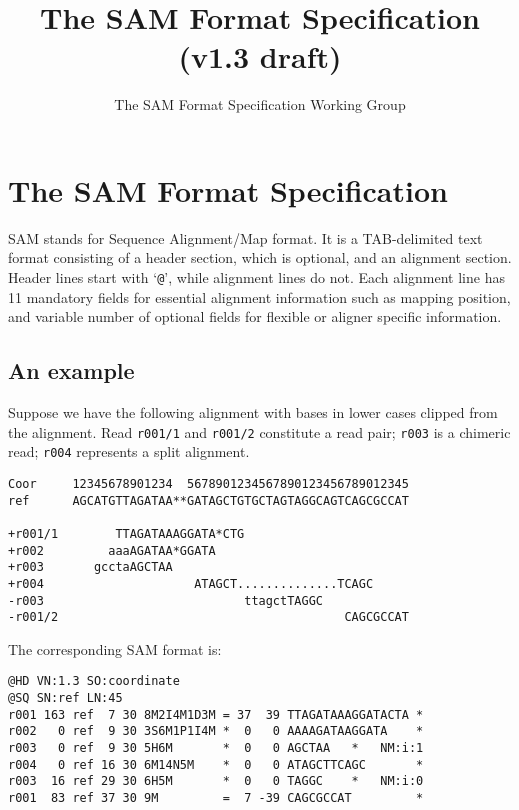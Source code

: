 \documentclass[10pt]{article}
\title{The SAM Format Specification (v1.3 draft)}
\author{The SAM Format Specification Working Group}
\begin{document}
\maketitle


\section{The SAM Format Specification}
SAM stands for Sequence Alignment/Map format. It is a TAB-delimited text
format consisting of a header section, which is optional, and an
alignment section. Header lines start with `{\tt @}', while alignment
lines do not. Each alignment line has 11 mandatory fields for essential
alignment information such as mapping position, and variable number of
optional fields for flexible or aligner specific information.

\subsection{An example}
Suppose we have the following alignment with bases in lower cases
clipped from the alignment. Read {\tt r001/1} and {\tt r001/2}
constitute a read pair; {\tt r003} is a chimeric read; {\tt r004}
represents a split alignment.

\begin{framed}\small
\begin{verbatim}
Coor     12345678901234  5678901234567890123456789012345
ref      AGCATGTTAGATAA**GATAGCTGTGCTAGTAGGCAGTCAGCGCCAT

+r001/1        TTAGATAAAGGATA*CTG
+r002         aaaAGATAA*GGATA
+r003       gcctaAGCTAA
+r004                     ATAGCT..............TCAGC
-r003                            ttagctTAGGC
-r001/2                                        CAGCGCCAT
\end{verbatim}
\end{framed}
The corresponding SAM format is:
\begin{framed}\small
\begin{verbatim}
@HD VN:1.3 SO:coordinate
@SQ SN:ref LN:45
r001 163 ref  7 30 8M2I4M1D3M = 37  39 TTAGATAAAGGATACTA *
r002   0 ref  9 30 3S6M1P1I4M *  0   0 AAAAGATAAGGATA    *
r003   0 ref  9 30 5H6M       *  0   0 AGCTAA   *   NM:i:1
r004   0 ref 16 30 6M14N5M    *  0   0 ATAGCTTCAGC       *
r003  16 ref 29 30 6H5M       *  0   0 TAGGC    *   NM:i:0
r001  83 ref 37 30 9M         =  7 -39 CAGCGCCAT         *
\end{verbatim}
\end{framed}
\end{document}
